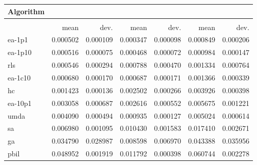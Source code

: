 \begin{tabular}{@{} l *{6}{>{{}}N{1}{2}} @{}}
\toprule
{Algorithm} &  \\
\midrule
&  &  &  \\
\midrule
& {mean} & {dev.} & {mean} & {dev.} & {mean} & {dev.} \\
\midrule
ea-1p1 & 0.000502 & 0.000109 & 0.000347 & 0.000098 & 0.000849 & 0.000206 \\
ea-1p10 & 0.000516 & 0.000075 & 0.000468 & 0.000072 & 0.000984 & 0.000147 \\
rls & 0.000546 & 0.000294 & 0.000788 & 0.000470 & 0.001334 & 0.000764 \\
ea-1c10 & 0.000680 & 0.000170 & 0.000687 & 0.000171 & 0.001366 & 0.000339 \\
hc & 0.001423 & 0.000136 & 0.002502 & 0.000266 & 0.003926 & 0.000398 \\
ea-10p1 & 0.003058 & 0.000687 & 0.002616 & 0.000552 & 0.005675 & 0.001221 \\
umda & 0.004090 & 0.000494 & 0.000935 & 0.000127 & 0.005024 & 0.000614 \\
sa & 0.006980 & 0.001095 & 0.010430 & 0.001583 & 0.017410 & 0.002671 \\
ga & 0.034790 & 0.028987 & 0.008598 & 0.006970 & 0.043388 & 0.035956 \\
pbil & 0.048952 & 0.001919 & 0.011792 & 0.000398 & 0.060744 & 0.002278 \\
\bottomrule
\end{tabular}

